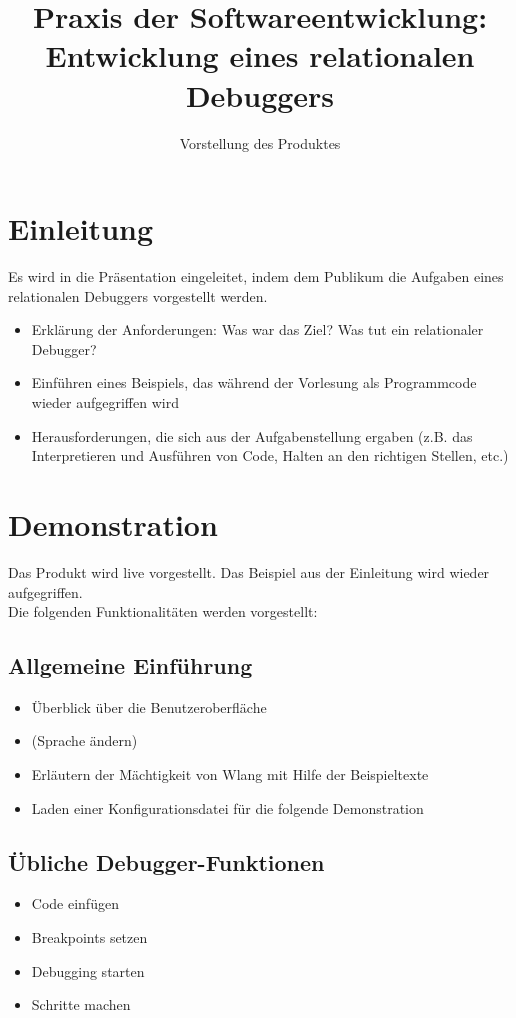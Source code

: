 \documentclass[parskip=full]{scrartcl}
\title{
	\vspace{2cm}
	\myfont 
	Praxis der Softwareentwicklung:\\ 
	Entwicklung eines relationalen Debuggers\\
}
\subtitle{
	\vspace{1cm}
	\myfont
	Vorstellung des Produktes
}
\begin{document}
\clearpage
\maketitle

{}

\section{Einleitung}
Es wird in die Präsentation eingeleitet, indem dem Publikum die Aufgaben eines relationalen Debuggers vorgestellt werden.
\begin{itemize}
\item Erklärung der Anforderungen: Was war das Ziel? Was tut ein relationaler Debugger?
\item Einführen eines Beispiels, das während der Vorlesung als Programmcode wieder aufgegriffen wird
\item Herausforderungen, die sich aus der Aufgabenstellung ergaben (z.B. das Interpretieren und Ausführen von Code, Halten an den richtigen Stellen, etc.)
\end{itemize}
\section{Demonstration}
Das Produkt wird live vorgestellt. Das Beispiel aus der Einleitung wird wieder aufgegriffen.\\
Die folgenden Funktionalitäten werden vorgestellt:
\subsection{Allgemeine Einführung}
\begin{itemize}
\item Überblick über die Benutzeroberfläche
\item (Sprache ändern)
\item Erläutern der Mächtigkeit von Wlang mit Hilfe der Beispieltexte
\item Laden einer Konfigurationsdatei für die folgende Demonstration
\end{itemize}

\subsection{Übliche Debugger-Funktionen}
\begin{itemize}
\item Code einfügen
\item Breakpoints setzen
\item Debugging starten
\item Schritte machen
\end{itemize}
\end{document}
